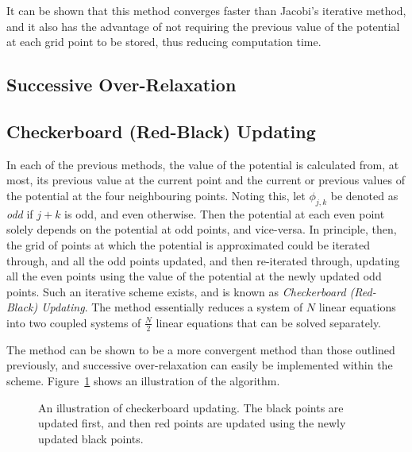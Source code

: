\documentclass[11pt, a4paper]{article}
\begin{document}
It can be shown that this method converges faster than Jacobi's iterative
method, and it also has the advantage of not requiring the previous value of the 
potential at each grid point to be stored, thus reducing computation time.

\subsection{Successive Over-Relaxation}


\subsection{Checkerboard (Red-Black) Updating}

In each of the previous methods, the value of the potential is calculated from, at most,
its previous value at the current point and the current or previous values of the
potential at the four neighbouring points. Noting this, let $\phi_{j,k}$ be denoted as
\emph{odd} if $j+k$ is odd, and even otherwise. Then the potential at each even point
solely depends on the potential at odd points, and vice-versa. In principle, then,
the grid of points at which the potential is approximated could be iterated through,
and all the odd points updated, and then re-iterated through, updating all the
even points using the value of the potential at the newly updated odd points. Such an
iterative scheme exists, and is known as \emph{Checkerboard (Red-Black) Updating}. The
method essentially reduces a system of $N$ linear equations into two coupled systems
of $\frac{N}{2}$ linear equations that can be solved separately.

The method can be shown to be a more convergent method than those outlined previously,
and successive over-relaxation can easily be implemented within the scheme.
Figure~\ref{fig:checker} shows an illustration of the algorithm.

\begin{figure}[h!]
\begin{center}
\end{center}
\caption{An illustration of checkerboard updating. The black points are updated first,
and then red points are updated using the newly updated black points.}
\label{fig:checker}
\end{figure}
\end{document}

